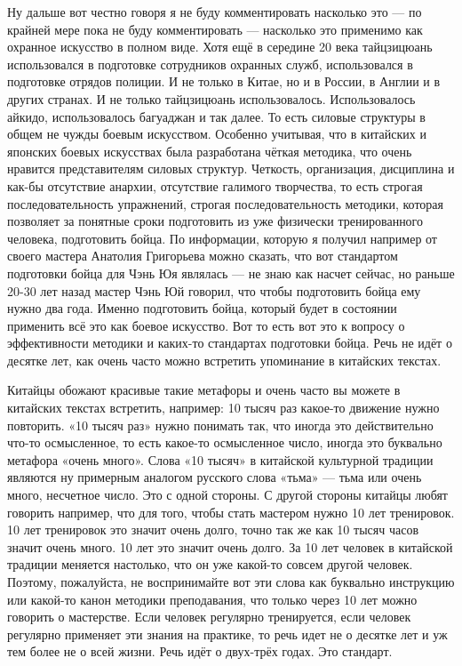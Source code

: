 Ну дальше вот честно говоря я
не буду комментировать насколько это --- по крайней мере пока не буду комментировать --- насколько 
это применимо как охранное искусство в полном виде. Хотя ещё в середине 20 века тайцзицюань 
использовался в подготовке сотрудников охранных служб, использовался в подготовке отрядов 
полиции. И не только в Китае, но и в России, в Англии и в других странах. И не только тайцзицюань 
использовалось. Использовалось айкидо, использовалось багуаджан и так далее. То есть 
силовые структуры в общем не чужды боевым искусством. Особенно учитывая, что в китайских и 
японских боевых искусствах была разработана чёткая методика, что очень нравится 
представителям силовых структур. Четкость, организация, дисциплина и как-бы отсутствие 
анархии, отсутствие галимого творчества, то есть строгая последовательность упражнений, 
строгая последовательность методики, которая позволяет за понятные сроки подготовить из 
уже физически тренированного человека, подготовить бойца. По информации, которую я получил 
например от своего мастера Анатолия Григорьева можно сказать, что вот стандартом подготовки 
бойца для Чэнь Юя являлась --- не знаю как насчет сейчас, но раньше 20-30 лет назад мастер Чэнь Юй
говорил, что чтобы подготовить бойца ему нужно два года. Именно подготовить бойца, который 
будет в состоянии применить всё это как боевое искусство. Вот то есть вот это к вопросу о 
эффективности методики и каких-то стандартах подготовки бойца. Речь не идёт о десятке 
лет, как очень часто можно встретить упоминание в китайских текстах.

Китайцы обожают 
красивые такие метафоры и очень часто вы можете в китайских текстах встретить, например: 10 
тысяч раз какое-то движение нужно повторить. «10 тысяч раз» нужно понимать так, что иногда это 
действительно что-то осмысленное, то есть какое-то осмысленное число, иногда это 
буквально метафора «очень много». Слова «10 тысяч» в китайской культурной традиции являются ну 
примерным аналогом русского слова «тьма» --- тьма или очень много, несчетное число. Это с одной 
стороны. С другой стороны китайцы любят говорить например, что для того, чтобы стать 
мастером нужно 10 лет тренировок. 10 лет тренировок это значит очень долго, точно так же как 10 
тысяч часов значит очень много. 10 лет это значит очень долго. За 10 лет человек в китайской 
традиции меняется настолько, что он уже какой-то совсем другой человек. Поэтому, пожалуйста, 
не воспринимайте вот эти слова как буквально инструкцию или какой-то канон методики 
преподавания, что только через 10 лет можно говорить о мастерстве. Если человек регулярно 
тренируется, если человек регулярно применяет эти знания на практике, то речь идет не о 
десятке лет и уж тем более не о всей жизни. Речь идёт о двух-трёх годах. Это стандарт.

